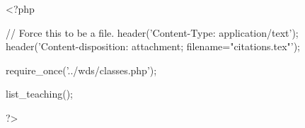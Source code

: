 <?php

// Force this to be a file.
header('Content-Type: application/text');
header('Content-disposition: attachment; filename="citations.tex"');

require_once('../wds/classes.php');

list_teaching();

?>
